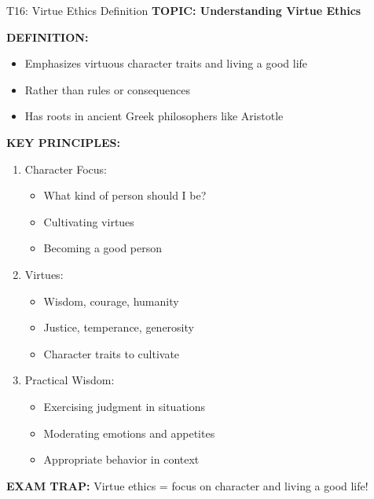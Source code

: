 \documentclass[8pt]{beamer}
\begin{document}
	\begin{frame}{T16: Virtue Ethics Definition}
		\fontsize{6.5}{7.5}\selectfont
		\textbf{TOPIC: Understanding Virtue Ethics}
		
		\vspace{0.1cm}
		\textbf{DEFINITION:}
		\begin{itemize}
			\item Emphasizes virtuous character traits and living a good life
			\item Rather than rules or consequences
			\item Has roots in ancient Greek philosophers like Aristotle
		\end{itemize}
		
		\vspace{0.1cm}
		\textbf{KEY PRINCIPLES:}
		\begin{enumerate}
			\item \textcolor{myblue}{Character Focus:}
			\begin{itemize}
				\item What kind of person should I be?
				\item Cultivating virtues
				\item Becoming a good person
			\end{itemize}
			\item \textcolor{myblue}{Virtues:}
			\begin{itemize}
				\item Wisdom, courage, humanity
				\item Justice, temperance, generosity
				\item Character traits to cultivate
			\end{itemize}
			\item \textcolor{myblue}{Practical Wisdom:}
			\begin{itemize}
				\item Exercising judgment in situations
				\item Moderating emotions and appetites
				\item Appropriate behavior in context
			\end{itemize}
		\end{enumerate}
		
		\textcolor{myred}{\textbf{EXAM TRAP:}} Virtue ethics = \textcolor{myblue}{focus on character and living a good life}!
	\end{frame}
	
\end{document}

